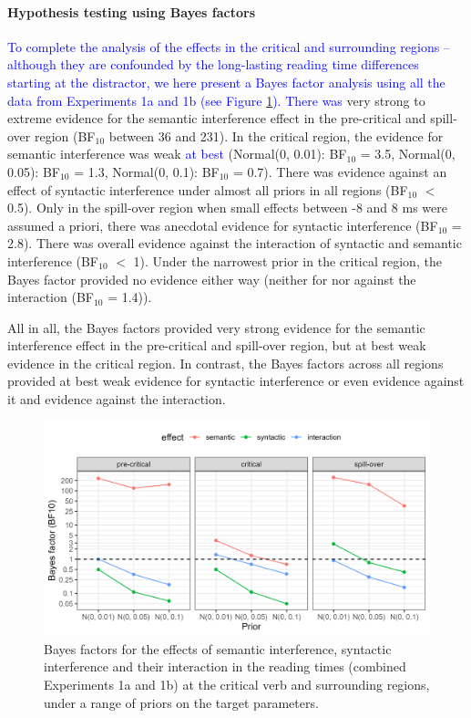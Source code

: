 \documentclass[review,preprint,12pt,authoryear,floatsintext]{elsarticle}
\begin{document}
\paragraph{Hypothesis testing using Bayes factors}
\textcolor{blue}{To complete the analysis of the effects in the critical and surrounding regions -- although they are confounded by the long-lasting reading time differences starting at the distractor, we here present a Bayes factor analysis using all the data from Experiments 1a and 1b (see Figure \ref{fig:spr_bfs}). There was} very strong to extreme evidence for the semantic interference effect in the pre-critical and spill-over region (BF$_{10}$ between 36 and 231). In the critical region, the evidence for semantic interference was weak \textcolor{blue}{at best} (Normal(0, 0.01): BF$_{10}$ = 3.5, Normal(0, 0.05): BF$_{10}$ = 1.3, Normal(0, 0.1): BF$_{10}$ = 0.7). There was evidence against an effect of syntactic interference under almost all priors in all regions (BF$_{10}$ $<$ 0.5). Only in the spill-over region when small effects between -8 and 8 ms were assumed a priori, there was anecdotal evidence for syntactic interference (BF$_{10}$ = 2.8). There was overall evidence against the interaction of syntactic and semantic interference (BF$_{10}$ $<$ 1). Under the narrowest prior in the critical region, the Bayes factor provided no evidence either way (neither for nor against the interaction (BF$_{10}$ = 1.4)).

All in all, the Bayes factors provided very strong evidence for the semantic interference effect in the pre-critical and spill-over region, but at best weak evidence in the critical region. In contrast, the Bayes factors  across all regions provided at best weak evidence for syntactic interference or even evidence against it and evidence against the interaction.

\begin{figure}[ht]
    \caption{Bayes factors for the effects of semantic interference, syntactic interference and their interaction in the reading times (combined Experiments 1a and 1b) at the critical verb and surrounding regions, under a range of priors on the target parameters.}
    \label{fig:spr_bfs}
    \centering
    \includegraphics[width=\textwidth]{BF_plot_spr_774_allregions.png}
\end{figure}
\end{document}
